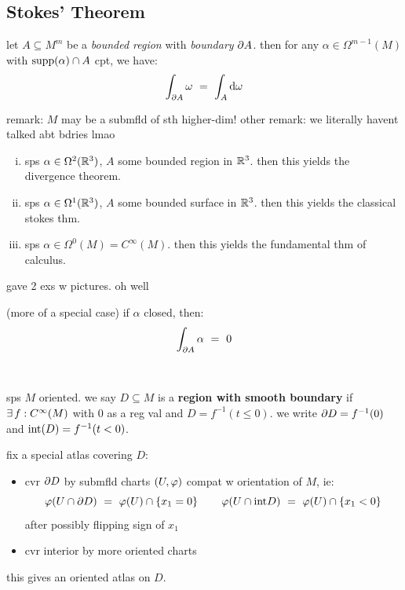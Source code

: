 \subsection{Stokes' Theorem}

\begin{thm}[title=Generalized Stokes' Theorem]
	let $A\subseteq M^{m}$ be a \textit{bounded region} with \textit{boundary} $\partial A$.
	then for any $\alpha\in\Omega^{m-1}(M)$ with $\operatorname{supp}(\alpha)\cap A$ cpt, we have:
	\begin{equation*}
		\int_{\p A}\omega \ = \ \int_{A}\d\omega
	\end{equation*}
\end{thm}
remark: $M$ may be a submfld of sth higher-dim!
other remark: we literally havent talked abt bdries lmao

\begin{xmp} \vspace{-0.2in}
	\begin{enumerate}[i)]
		\item sps $\alpha\in\Omega^{2}(\mathbb{R}^{3})$, $A$ some bounded region in $\mathbb{R}^{3}$.
			then this yields the divergence theorem.
		\item sps $\alpha\in\Omega^{1}(\mathbb{R}^{3})$, $A$ some bounded surface in $\mathbb{R}^{3}$.
			then this yields the classical stokes thm.
		\item sps $\alpha\in\Omega^{0}(M)=C^{\infty}(M)$.
			then this yields the fundamental thm of calculus.
	\end{enumerate}
\end{xmp}
gave 2 exs w pictures. oh well

\begin{crll}
	(more of a special case) if $\alpha$ closed, then:
	\begin{equation*}
		\int_{\p A}\alpha \ = \ 0
	\end{equation*}
\end{crll} \

\begin{defn}
	sps $M$ oriented.
	we say $D\subseteq M$ is a \textbf{region with smooth boundary} if
	$\ex f:C^{\infty}(M)$ with 0 as a reg val and $D=f^{-1}(t\leq0)$.
	we write $\partial D=f^{-1}(0)$ and $\textrm{int}(D)=f^{-1}(t<0)$.
\end{defn}
fix a special atlas covering $D$:
\begin{itemize}
	\item cvr $\partial D$ by submfld charts $(U,\varphi)$ compat w orientation of $M$, ie:
		\begin{equation*}
			\vphi(U\cap\p D) \ = \ \vphi(U)\cap\set{x_{1}=0} \qquad
			\vphi(U\cap\trm{int}D) \ = \ \vphi(U)\cap\set{x_{1}<0}
		\end{equation*}
		after possibly flipping sign of $x_{1}$
	\item cvr interior by more oriented charts
\end{itemize}
this gives an oriented atlas on $D$.

